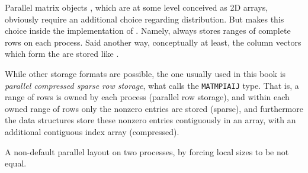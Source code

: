 Parallel matrix objects \pMat, which are at some level conceived as 2D arrays, obviously require an additional choice regarding distribution.  But \PETSc makes this choice inside the implementation of \pMat.  Namely, \PETSc always stores ranges of complete rows on each process.  Said another way, conceptually at least, the column vectors which form the \pMat are stored like \pVecs.

While other storage formats are possible, the one usually used in this book is \emph{parallel compressed sparse row storage}, what \PETSc calls the \texttt{MATMPIAIJ} type.  That is, a range of rows is owned by each process (parallel row storage), and within each owned range of rows only the nonzero entries are stored (sparse), and furthermore the data structures store these nonzero entries contiguously in an array, with an additional contiguous index array (compressed).

\begin{marginfigure}
\bigskip
\caption{A non-default parallel \pVec layout on two processes, by forcing local sizes to be not equal.}
\label{fig:artificialmpitwoveclayout}
\end{marginfigure}


